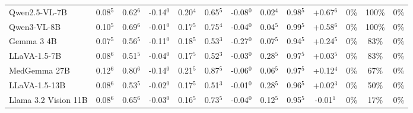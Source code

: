 \begin{table}[t]
{\begin{tabular}{l@{\hspace{3pt}}ccc@{\hspace{4pt}}ccc@{\hspace{4pt}}ccc@{\hspace{4pt}}ccc}
Qwen2.5-VL-7B & \cellcolor{cfSage2}0.08$^{5}$ & \cellcolor{cfSage2}0.62$^{6}$ & \cellcolor{cfSlate3}-0.14$^{0}$ & \cellcolor{cfSage3}0.20$^{4}$ & \cellcolor{cfSage2}0.65$^{5}$ & \cellcolor{cfSlate2}-0.08$^{0}$ & \cellcolor{cfSage1}0.02$^{4}$ & \cellcolor{cfSage4}0.98$^{5}$ & \cellcolor{cfTerra4}+0.67$^{6}$ & \cellcolor{cfTerra1}0\% & \cellcolor{cfTerra4}100\% & 0\% \\
Qwen3-VL-8B & \cellcolor{cfSage2}0.10$^{5}$ & \cellcolor{cfSage2}0.69$^{6}$ & \cellcolor{cfSlate1}-0.01$^{0}$ & \cellcolor{cfSage3}0.17$^{5}$ & \cellcolor{cfSage2}0.75$^{4}$ & \cellcolor{cfSlate2}-0.04$^{0}$ & \cellcolor{cfSage1}0.04$^{5}$ & \cellcolor{cfSage4}0.99$^{5}$ & \cellcolor{cfTerra4}+0.58$^{6}$ & \cellcolor{cfTerra1}0\% & \cellcolor{cfTerra4}100\% & 0\% \\
Gemma 3 4B & \cellcolor{cfSage2}0.07$^{5}$ & \cellcolor{cfSage1}0.56$^{5}$ & \cellcolor{cfSlate3}-0.11$^{0}$ & \cellcolor{cfSage3}0.18$^{5}$ & \cellcolor{cfSage1}0.53$^{3}$ & \cellcolor{cfSlate4}-0.27$^{0}$ & \cellcolor{cfSage2}0.07$^{5}$ & \cellcolor{cfSage4}0.94$^{5}$ & \cellcolor{cfTerra3}+0.24$^{5}$ & \cellcolor{cfTerra1}0\% & \cellcolor{cfTerra3}83\% & 0\% \\
LLaVA-1.5-7B & \cellcolor{cfSage2}0.08$^{6}$ & \cellcolor{cfSage1}0.51$^{5}$ & \cellcolor{cfSlate2}-0.04$^{0}$ & \cellcolor{cfSage3}0.17$^{5}$ & \cellcolor{cfSage1}0.52$^{3}$ & \cellcolor{cfSlate2}-0.03$^{0}$ & \cellcolor{cfSage4}0.28$^{5}$ & \cellcolor{cfSage4}0.97$^{5}$ & \cellcolor{cfTerra2}+0.03$^{5}$ & \cellcolor{cfTerra1}0\% & \cellcolor{cfTerra3}83\% & 0\% \\
MedGemma 27B & \cellcolor{cfSage3}0.12$^{6}$ & \cellcolor{cfSage3}0.80$^{6}$ & \cellcolor{cfSlate3}-0.14$^{0}$ & \cellcolor{cfSage4}0.21$^{5}$ & \cellcolor{cfSage3}0.87$^{5}$ & \cellcolor{cfSlate2}-0.06$^{0}$ & \cellcolor{cfSage2}0.06$^{5}$ & \cellcolor{cfSage4}0.97$^{5}$ & \cellcolor{cfTerra3}+0.12$^{4}$ & \cellcolor{cfTerra1}0\% & \cellcolor{cfTerra3}67\% & 0\% \\
LLaVA-1.5-13B & \cellcolor{cfSage2}0.08$^{6}$ & \cellcolor{cfSage1}0.53$^{5}$ & \cellcolor{cfSlate2}-0.02$^{0}$ & \cellcolor{cfSage3}0.17$^{5}$ & \cellcolor{cfSage1}0.51$^{3}$ & \cellcolor{cfSlate1}-0.01$^{0}$ & \cellcolor{cfSage4}0.28$^{5}$ & \cellcolor{cfSage4}0.96$^{5}$ & \cellcolor{cfTerra2}+0.02$^{3}$ & \cellcolor{cfTerra1}0\% & \cellcolor{cfTerra3}50\% & 0\% \\
Llama 3.2 Vision 11B & \cellcolor{cfSage2}0.08$^{6}$ & \cellcolor{cfSage2}0.65$^{6}$ & \cellcolor{cfSlate2}-0.03$^{0}$ & \cellcolor{cfSage3}0.16$^{5}$ & \cellcolor{cfSage2}0.73$^{5}$ & \cellcolor{cfSlate2}-0.04$^{0}$ & \cellcolor{cfSage3}0.12$^{5}$ & \cellcolor{cfSage4}0.95$^{5}$ & \cellcolor{cfSlate1}-0.01$^{1}$ & \cellcolor{cfTerra1}0\% & \cellcolor{cfTerra2}17\% & 0\% \\

\end{tabular}}
\end{table}
